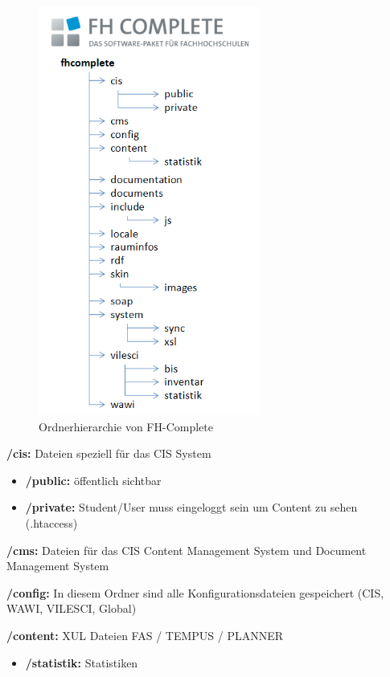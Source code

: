 \begin{figure}
	\centering
	\includegraphics[width=0.65\textwidth]{Kodierrichtlinien_Ordnerhierarchie.png}
	\caption{Ordnerhierarchie von FH-Complete}
	\label{Ordnerhierarchie}
\end{figure}

\newpage
{\bf/cis:} Dateien speziell f\"ur das CIS System
\begin{itemize}
	\item{{\bf/public:} \"offentlich sichtbar}
	\item{{\bf/private:} Student/User muss eingeloggt sein um Content zu sehen (.htaccess)}
\end{itemize}

{\bf/cms:} Dateien f\"ur das CIS Content Management System und Document Management System

{\bf/config:} In diesem Ordner sind alle Konfigurationsdateien gespeichert (CIS, WAWI, VILESCI, Global) 

{\bf/content:} XUL Dateien FAS / TEMPUS / PLANNER
\begin{itemize}
	\item{{\bf/statistik:} Statistiken}
\end{itemize}

